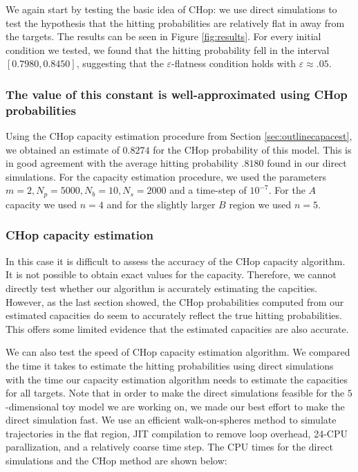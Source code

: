 \documentclass[english, aip, jcp, priprint, graphicx,floatfix]{revtex4-1}
\theoremstyle{plain}
\theoremstyle{definition}
\theoremstyle{plain}
\begin{document}
We again start by testing the basic idea of CHop: we use direct simulations to test the hypothesis that the hitting probabilities are relatively flat in away from the targets.  The results can be seen in Figure \ref{fig:results}.   For every initial condition we tested, we found that the hitting probability fell in the interval $[0.7980, 0.8450]$, suggesting that the $\varepsilon$-flatness condition holds with $\varepsilon \approx .05$.



\subsubsection{The value of this constant is well-approximated using CHop probabilities}

Using the CHop capacity estimation procedure from Section \ref{sec:outlinecapacest}, we obtained an estimate of $0.8274$ for the CHop probability of this model.  This is in good agreement with the average hitting probability $.8180$ found in our direct simulations.  For the capacity estimation procedure, we used the parameters $m=2,N_p=5000,N_b=10,N_s=2000$ and a time-step of $10^{-7}$.  For the $A$ capacity we used $n=4$ and for the slightly larger $B$ region we used $n=5$.  

\subsubsection{CHop capacity estimation}

In this case it is difficult to assess the accuracy of the CHop capacity algorithm.  It is not possible to obtain exact values for the capacity.  Therefore, we cannot directly test whether our algorithm is accurately estimating the capcities.  However, as the last section showed, the CHop probabilities computed from our estimated capacities do seem to accurately reflect the true hitting probabilities.  This offers some limited evidence that the estimated capacities are also accurate.

We can also test the speed of CHop capacity estimation algorithm.  We compared the time it takes to estimate the hitting probabilities using direct simulations with the time our capacity estimation algorithm needs to estimate the capacities for all targets. Note that in order to make the direct simulations feasible for the $5$-dimensional toy model we are working on, we made our best effort to make the direct simulation fast.  We use an efficient walk-on-spheres method to simulate trajectories in the flat region,\cite{bingham1972random} JIT compilation to remove loop overhead, 24-CPU parallization, and a relatively coarse time step.  The CPU times for the direct simulations and the CHop method are shown below:
\end{document}
